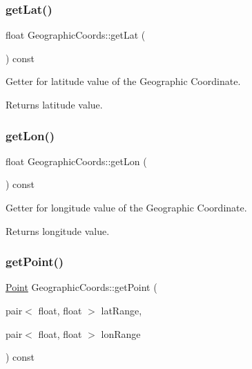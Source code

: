 \subsubsection{\texorpdfstring{get\+Lat()}{getLat()}}
{\footnotesize\ttfamily float Geographic\+Coords\+::get\+Lat (\begin{DoxyParamCaption}{ }\end{DoxyParamCaption}) const}

Getter for latitude value of the Geographic Coordinate.

\begin{DoxyReturn}{Returns}
latitude value. 
\end{DoxyReturn}
\hypertarget{class_geographic_coords_a4e59f2e3ea261e73c33014368770ad21}{}\label{class_geographic_coords_a4e59f2e3ea261e73c33014368770ad21} 
\subsubsection{\texorpdfstring{get\+Lon()}{getLon()}}
{\footnotesize\ttfamily float Geographic\+Coords\+::get\+Lon (\begin{DoxyParamCaption}{ }\end{DoxyParamCaption}) const}

Getter for longitude value of the Geographic Coordinate.

\begin{DoxyReturn}{Returns}
longitude value. 
\end{DoxyReturn}
\hypertarget{class_geographic_coords_aa333be28efcee6d8da24adabe5cd5594}{}\label{class_geographic_coords_aa333be28efcee6d8da24adabe5cd5594} 
\subsubsection{\texorpdfstring{get\+Point()}{getPoint()}}
{\footnotesize\ttfamily \hyperlink{class_point}{Point} Geographic\+Coords\+::get\+Point (\begin{DoxyParamCaption}\item[{pair$<$ float, float $>$}]{lat\+Range,  }\item[{pair$<$ float, float $>$}]{lon\+Range }\end{DoxyParamCaption}) const}


